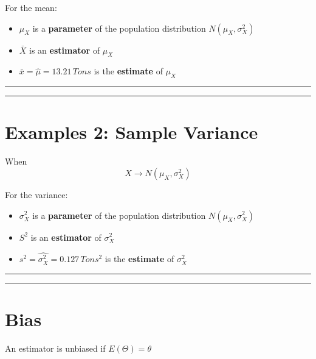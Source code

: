 \documentclass[
]{book}
\providecommand{\tightlist}{%
  \setlength{\itemsep}{0pt}\setlength{\parskip}{0pt}}
\begin{document}
For the mean:

\begin{itemize}
\tightlist
\item
  \(\mu_X\) is a \textbf{parameter} of the population distribution \(N(\mu_X, \sigma^2_X)\)
\item
  \(\bar{X}\) is an \textbf{estimator} of \(\mu_X\)
\item
  \(\bar{x}=\hat{\mu}=13.21 \, Tons\) is the \textbf{estimate} of \(\mu_X\)
\end{itemize}

\begin{center}\rule{0.5\linewidth}{0.5pt}\end{center}

\begin{center}\rule{0.5\linewidth}{0.5pt}\end{center}

\hypertarget{examples-2-sample-variance}{%
\section{Examples 2: Sample Variance}\label{examples-2-sample-variance}}

When \[X \rightarrow N(\mu_X, \sigma^2_X)\]

For the variance:

\begin{itemize}
\tightlist
\item
  \(\sigma^2_X\) is a \textbf{parameter} of the population distribution \(N(\mu_X, \sigma^2_X)\)
\item
  \(S^2\) is an \textbf{estimator} of \(\sigma^2_X\)
\item
  \(s^2=\hat{\sigma^2_X}=0.127 \, Tons^2\) is the \textbf{estimate} of \(\sigma^2_X\)
\end{itemize}

\begin{center}\rule{0.5\linewidth}{0.5pt}\end{center}

\begin{center}\rule{0.5\linewidth}{0.5pt}\end{center}

\hypertarget{bias}{%
\section{Bias}\label{bias}}

An estimator is unbiased if \(E(\Theta)=\theta\)
\end{document}
